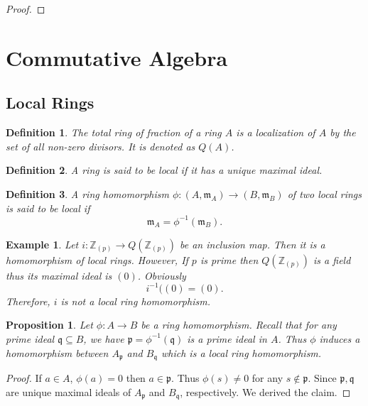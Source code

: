 \documentclass{article}
\newtheorem{proposition}{Proposition}[section]
\newtheorem{definition}{Definition}[section]
\newtheorem{example}{Example}[section]
\numberwithin{equation}{section}
\begin{document}
\begin{proof}
\end{proof}

\section{Commutative Algebra}

\subsection{Local Rings}

\begin{definition}
The total ring of fraction of a ring $A$ is a localization of $A$ by the set of all non-zero divisors. It is denoted as $Q(A)$.
\end{definition}

\begin{definition}
A ring is said to be local if it has a unique maximal ideal.
\end{definition}

\begin{definition}
A ring homomorphism $\phi:(A,\mathfrak{m}_A)\to (B,\mathfrak{m}_B)$ of two local rings is said to be local if 
\begin{equation*}
\mathfrak{m}_A = \phi^{-1}(\mathfrak{m}_B).
\end{equation*}
\end{definition}

\begin{example}
Let $i:\mathbb{Z}_{(p)}\to Q(\mathbb{Z}_{(p)})$ be an inclusion map. Then it is a homomorphism of local rings. However, If $p$ is prime then $Q(\mathbb{Z}_{(p)})$ is a field thus its maximal ideal is $(0)$. Obviously
\begin{equation*}
i^{-1}((0) = (0).
\end{equation*}
Therefore, $i$ is not a local ring homomorphism.
\end{example}

\begin{proposition}
Let $\phi:A\to B$ be a ring homomorphism. Recall that for any prime ideal $\mathfrak{q}\subseteq B$, we have $\mathfrak{p}=\phi^{-1}(\mathfrak{q})$ is a prime ideal in $A$. Thus $\phi$ induces a homomorphism between $A_{\mathfrak{p}}$ and $B_{\mathfrak{q}}$ which is a local ring homomorphism.
\end{proposition}

\begin{proof}
If $a\in A$, $\phi(a)=0$ then $a\in\mathfrak{p}$. Thus $\phi(s)\not=0$ for any $s\not\in\mathfrak{p}$. Since $\mathfrak{p},\mathfrak{q}$ are unique maximal ideals of  $A_{\mathfrak{p}}$ and $B_{\mathfrak{q}}$, respectively. We derived the claim.
\end{proof}
\end{document}
